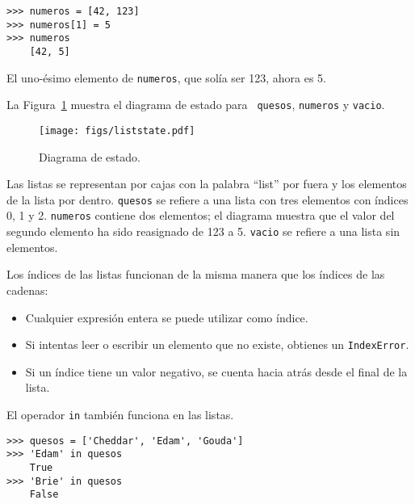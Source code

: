 \documentclass[10pt]{book}
\begin{document}
\begin{verbatim}
>>> numeros = [42, 123]
>>> numeros[1] = 5
>>> numeros
    [42, 5]
\end{verbatim}
%
El uno-ésimo elemento de {\tt numeros}, que
solía ser 123, ahora es 5.

La Figura~\ref{fig.liststate} muestra
el diagrama de estado para {\tt
quesos}, {\tt numeros} y {\tt vacio}.

\begin{figure}
\centerline
{\texttt{[image: figs/liststate.pdf]}}
\caption{Diagrama de estado.}
\label{fig.liststate}
\end{figure}

Las listas se representan por cajas con la palabra ``list'' por fuera
y los elementos de la lista por dentro.  {\tt quesos} se refiere a
una lista con tres elementos con índices 0, 1 y 2.
{\tt numeros} contiene dos elementos; el diagrama muestra que el
valor del segundo elemento ha sido reasignado de 123 a 5.
{\tt vacio} se refiere a una lista sin elementos.

Los índices de las listas funcionan de la misma manera que los índices de las cadenas:

\begin{itemize}

\item Cualquier expresión entera se puede utilizar como índice.

\item Si intentas leer o escribir un elemento que no existe,
obtienes un {\tt IndexError}.

\item Si un índice tiene un valor negativo, se cuenta hacia atrás desde el
final de la lista.

\end{itemize}


El operador {\tt in} también funciona en las listas.

\begin{verbatim}
>>> quesos = ['Cheddar', 'Edam', 'Gouda']
>>> 'Edam' in quesos
    True
>>> 'Brie' in quesos
    False
\end{verbatim}
\end{document}
